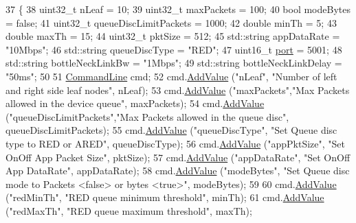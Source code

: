 \begin{DoxyCode}
37 \{
38   uint32\_t    nLeaf = 10;
39   uint32\_t    maxPackets = 100;
40   \textcolor{keywordtype}{bool}        modeBytes  = \textcolor{keyword}{false};
41   uint32\_t    queueDiscLimitPackets = 1000;
42   \textcolor{keywordtype}{double}      minTh = 5;
43   \textcolor{keywordtype}{double}      maxTh = 15;
44   uint32\_t    pktSize = 512;
45   std::string appDataRate = \textcolor{stringliteral}{"10Mbps"};
46   std::string queueDiscType = \textcolor{stringliteral}{"RED"};
47   uint16\_t \hyperlink{dsdv-manet_8cc_a8e0798404bf2cf5dabb84c5ba9a4f236}{port} = 5001;
48   std::string bottleNeckLinkBw = \textcolor{stringliteral}{"1Mbps"};
49   std::string bottleNeckLinkDelay = \textcolor{stringliteral}{"50ms"};
50 
51   \hyperlink{classns3_1_1CommandLine}{CommandLine} cmd;
52   cmd.\hyperlink{classns3_1_1CommandLine_addcfb546c7ad4c8bd0965654d55beb8e}{AddValue} (\textcolor{stringliteral}{"nLeaf"},     \textcolor{stringliteral}{"Number of left and right side leaf nodes"}, nLeaf);
53   cmd.\hyperlink{classns3_1_1CommandLine_addcfb546c7ad4c8bd0965654d55beb8e}{AddValue} (\textcolor{stringliteral}{"maxPackets"},\textcolor{stringliteral}{"Max Packets allowed in the device queue"}, maxPackets);
54   cmd.\hyperlink{classns3_1_1CommandLine_addcfb546c7ad4c8bd0965654d55beb8e}{AddValue} (\textcolor{stringliteral}{"queueDiscLimitPackets"},\textcolor{stringliteral}{"Max Packets allowed in the queue disc"}, 
      queueDiscLimitPackets);
55   cmd.\hyperlink{classns3_1_1CommandLine_addcfb546c7ad4c8bd0965654d55beb8e}{AddValue} (\textcolor{stringliteral}{"queueDiscType"}, \textcolor{stringliteral}{"Set Queue disc type to RED or ARED"}, queueDiscType);
56   cmd.\hyperlink{classns3_1_1CommandLine_addcfb546c7ad4c8bd0965654d55beb8e}{AddValue} (\textcolor{stringliteral}{"appPktSize"}, \textcolor{stringliteral}{"Set OnOff App Packet Size"}, pktSize);
57   cmd.\hyperlink{classns3_1_1CommandLine_addcfb546c7ad4c8bd0965654d55beb8e}{AddValue} (\textcolor{stringliteral}{"appDataRate"}, \textcolor{stringliteral}{"Set OnOff App DataRate"}, appDataRate);
58   cmd.\hyperlink{classns3_1_1CommandLine_addcfb546c7ad4c8bd0965654d55beb8e}{AddValue} (\textcolor{stringliteral}{"modeBytes"}, \textcolor{stringliteral}{"Set Queue disc mode to Packets <false> or bytes <true>"}, modeBytes);
59 
60   cmd.\hyperlink{classns3_1_1CommandLine_addcfb546c7ad4c8bd0965654d55beb8e}{AddValue} (\textcolor{stringliteral}{"redMinTh"}, \textcolor{stringliteral}{"RED queue minimum threshold"}, minTh);
61   cmd.\hyperlink{classns3_1_1CommandLine_addcfb546c7ad4c8bd0965654d55beb8e}{AddValue} (\textcolor{stringliteral}{"redMaxTh"}, \textcolor{stringliteral}{"RED queue maximum threshold"}, maxTh);

\end{DoxyCode}
